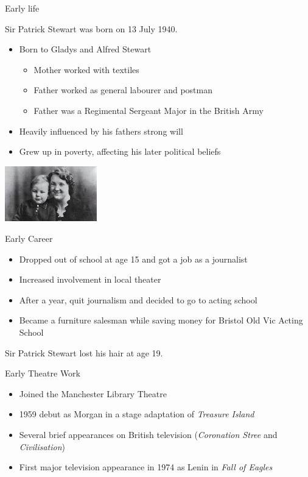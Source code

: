 \documentclass[xcolor=dvipsnames]{beamer}
\begin{document}
\begin{frame}{Early life}
  \begin{fct}
    Sir Patrick Stewart was born on 13 July 1940.
  \end{fct}
  \begin{itemize}
    \item Born to Gladys and Alfred Stewart
    \begin{itemize}
      \item Mother worked with textiles
      \item Father worked as general labourer and postman
      \item Father was a Regimental Sergeant Major in the British Army
    \end{itemize}
    \item Heavily influenced by his fathers strong will
    \item Grew up in poverty, affecting his later political beliefs
  \end{itemize}
  \begin{center}
    \includegraphics[width=0.3\textwidth]{kid.jpg}
  \end{center}
\end{frame}

\begin{frame}{Early Career}
  \begin{itemize}
    \item Dropped out of school at age 15 and got a job as a journalist
    \item Increased involvement in local theater
    \item After a year, quit journalism and decided to go to acting school
    \item Became a furniture salesman while saving money for Bristol Old Vic
    Acting School
  \end{itemize}
  \begin{fct}
    Sir Patrick Stewart lost his hair at age 19.
  \end{fct}
\end{frame}

\begin{frame}{Early Theatre Work}
  \begin{itemize}
    \item Joined the Manchester Library Theatre
    \item 1959 debut as Morgan in a stage adaptation of \emph{Treasure Island}
    \item Several brief appearances on British television (\emph{Coronation
    Stree} and \emph{Civilisation})
    \item First major television appearance in 1974 as Lenin in \emph{Fall of Eagles}
  \end{itemize}
\end{frame}
\end{document}
